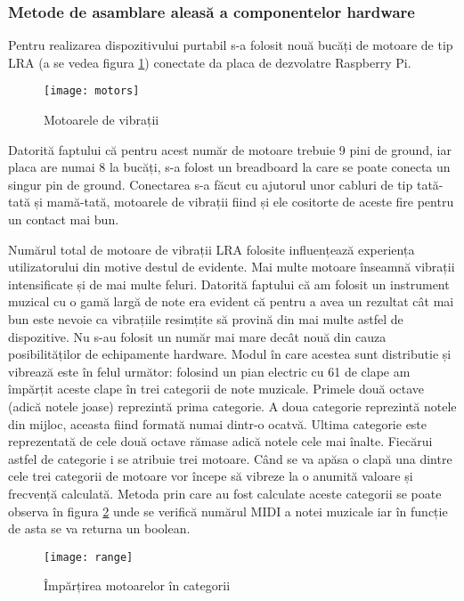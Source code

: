 \documentclass[../IoMusT.tex]{subfiles}
\begin{document}
\subsubsection{Metode de asamblare aleasă a componentelor hardware}
Pentru realizarea dispozitivului purtabil s-a folosit nouă bucăți de motoare de tip LRA (a se vedea figura \ref{fig:motors}) conectate da placa de dezvolatre Raspberry Pi.
\begin{figure}[h]
\centering
\texttt{[image: motors]}
\caption{Motoarele de vibrații}
\label{fig:motors}
\end{figure}  
 Datorită faptului că pentru acest număr de motoare trebuie 9 pini de ground, iar placa are numai 8 la bucăți, s-a folost un breadboard  la care se poate conecta un singur pin de ground. Conectarea s-a făcut cu ajutorul unor cabluri de tip tată-tată și mamă-tată, motoarele de vibrații fiind și ele cositorte de aceste fire pentru un contact mai bun.
\\
\par Numărul total de motoare de vibrații LRA folosite influențează experiența utilizatorului din motive destul de evidente. Mai multe motoare înseamnă vibrații intensificate și de mai multe feluri. Datorită faptului că am folosit un instrument muzical cu o gamă largă de note era evident că pentru a avea un rezultat cât mai bun este nevoie ca vibrațiile resimțite să provină din mai multe astfel de dispozitive. Nu s-au folosit un număr mai mare decât nouă din cauza posibilităților de echipamente hardware. Modul în care acestea sunt distributie și vibrează este în felul următor: folosind un pian electric cu 61 de clape am împărțit aceste clape în trei categorii de note muzicale. Primele două octave (adică notele joase) reprezintă prima categorie. A doua categorie reprezintă notele din mijloc, aceasta fiind formată numai dintr-o ocatvă. Ultima categorie este reprezentată de cele două octave rămase adică notele cele mai înalte. Fiecărui astfel de categorie i se atribuie trei motoare. Când se va apăsa o clapă una dintre cele trei categorii de motoare vor începe să vibreze la o anumită valoare și frecvență calculată. Metoda prin care au fost calculate aceste categorii se poate observa în figura \ref{fig:range} unde se verifică numărul MIDI a notei muzicale iar în funcție de asta se va returna un boolean.
\begin{figure}[h]
\centering
\texttt{[image: range]}
\caption{Împărțirea motoarelor în categorii}
\label{fig:range}
\end{figure}  
\end{document}
